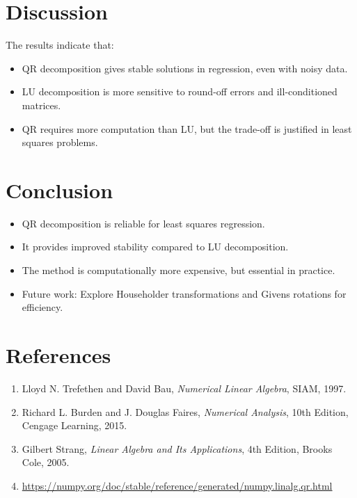 \documentclass[14pt,a4paper]{article}
\begin{document}
\section{Discussion}
The results indicate that:  
\begin{itemize}
    \item QR decomposition gives stable solutions in regression, even with noisy data.  
    \item LU decomposition is more sensitive to round-off errors and ill-conditioned matrices.  
    \item QR requires more computation than LU, but the trade-off is justified in least squares problems.  
\end{itemize}

\section{Conclusion}
\begin{itemize}
    \item QR decomposition is reliable for least squares regression.  
    \item It provides improved stability compared to LU decomposition.  
    \item The method is computationally more expensive, but essential in practice.  
    \item Future work: Explore Householder transformations and Givens rotations for efficiency.  
\end{itemize}

\section{References}
\begin{enumerate}
    \item Lloyd N. Trefethen and David Bau, \textit{Numerical Linear Algebra}, SIAM, 1997.  
    \item Richard L. Burden and J. Douglas Faires, \textit{Numerical Analysis}, 10th Edition, Cengage Learning, 2015.  
    \item Gilbert Strang, \textit{Linear Algebra and Its Applications}, 4th Edition, Brooks Cole, 2005.  
    \item \url{https://numpy.org/doc/stable/reference/generated/numpy.linalg.qr.html}  
\end{enumerate}
\end{document}
